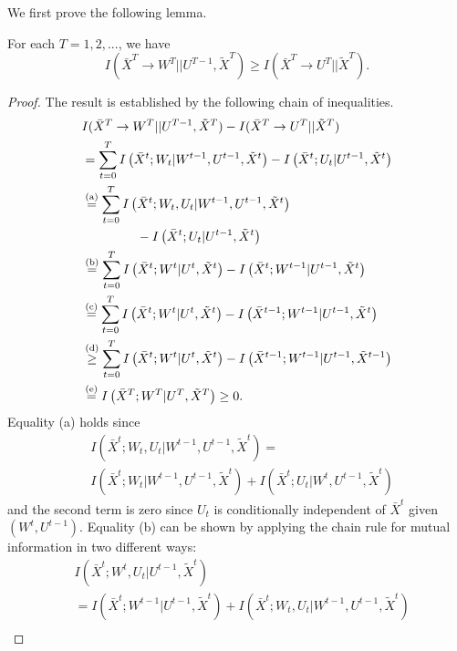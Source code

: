 We first prove the following lemma.
\begin{lemma}
\label{lemcoding}
For each $T=1, 2, ...$, we have
\[
I(\bar{X}^{T} \rightarrow W^{T} || U^{T-1},\tilde{X}^{T}) \geq I(\bar{X}^{T} \rightarrow U^{T} || \tilde{X}^{T}).
\]
\end{lemma}
\begin{proof}
The result is established by the following chain of inequalities.
\begin{align*}
&  I(\bar{X}^T \rightarrow W^T || U^{T-1},\tilde{X}^T) - I(\bar{X}^T \rightarrow U^T || \tilde{X}^T)  \\
& = \sum_{t=0}^T I\left(\bar{X}^t;W_t|W^{t-1},U^{t-1},\tilde{X}^t \right) - I\left(\bar{X}^t;U_t|U^{t-1},\tilde{X}^t \right)\\
& \stackrel{\text{(a)}}{=} \sum_{t=0}^T I\left(\bar{X}^t;W_t,U_t|W^{t-1},U^{t-1},\tilde{X}^t \right) \\
& \hspace{10ex}- I\left(\bar{X}^t;U_t|U^{t-1},\tilde{X}^t \right)\\
& \stackrel{\text{(b)}}{=} \sum_{t=0}^T I\left(\bar{X}^t;W^t|U^{t},\tilde{X}^t \right) - I\left(\bar{X}^t;W^{t-1}|U^{t-1},\tilde{X}^t \right)\\
& \stackrel{\text{(c)}}{=} \sum_{t=0}^T I\left(\bar{X}^t;W^t|U^{t},\tilde{X}^t \right) - I\left(\bar{X}^{t-1};W^{t-1}|U^{t-1},\tilde{X}^t \right)\\
& \stackrel{\text{(d)}}{\geq} \sum_{t=0}^T I\left(\bar{X}^t;W^t|U^{t},\tilde{X}^t \right) - I\left(\bar{X}^{t-1};W^{t-1}|U^{t-1},\tilde{X}^{t-1} \right)\\
& \stackrel{\text{(e)}}{=} I\left(\bar{X}^T;W^T | U^T,\tilde{X}^T \right) \geq 0. 
\end{align*}
Equality (a) holds since
\begin{align*}
&I(\bar{X}^t; W_t, U_t|W^{t-1}, U^{t-1}, \tilde{X}^t)=\\
&I(\bar{X}^t; W_t|W^{t-1}, U^{t-1}, \tilde{X}^t)
+I(\bar{X}^t; U_t|W^t, U^{t-1}, \tilde{X}^t)
\end{align*}
and the second term is zero since $U_t$ is conditionally independent of $\bar{X}^t$ given $(W^t, U^{t-1})$. Equality (b) can be shown by applying the chain rule for mutual information in two different ways:
\begin{align*}
&I(\bar{X}^t; W^t, U_t|U^{t-1}, \tilde{X}^t) \\
&=I(\bar{X}^t; W^{t-1}|U^{t-1}, \tilde{X}^t)+I(\bar{X}^t; W_t, U_t| W^{t-1}, U^{t-1}, \tilde{X}^t) \\

\end{align*}
\end{proof}
